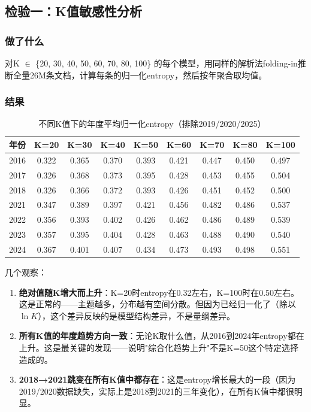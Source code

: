\documentclass[12pt,a4paper]{ctexart}
\begin{document}
\subsection{检验一：K值敏感性分析}

\subsubsection{做了什么}

对K $\in$ \{20, 30, 40, 50, 60, 70, 80, 100\} 的每个模型，用同样的解析法folding-in推断全量26M条文档，计算每条的归一化entropy，然后按年聚合取均值。

\subsubsection{结果}

\begin{table}[H]
\centering
\small
\begin{tabular}{lcccccccc}
\toprule
年份 & K=20 & K=30 & K=40 & K=50 & K=60 & K=70 & K=80 & K=100 \\
\midrule
2016 & 0.322 & 0.365 & 0.370 & 0.393 & 0.421 & 0.447 & 0.450 & 0.497 \\
2017 & 0.326 & 0.368 & 0.373 & 0.395 & 0.428 & 0.453 & 0.455 & 0.504 \\
2018 & 0.326 & 0.366 & 0.372 & 0.393 & 0.426 & 0.451 & 0.452 & 0.500 \\
2021 & 0.347 & 0.389 & 0.397 & 0.421 & 0.456 & 0.482 & 0.486 & 0.537 \\
2022 & 0.356 & 0.393 & 0.402 & 0.426 & 0.462 & 0.486 & 0.489 & 0.539 \\
2023 & 0.357 & 0.395 & 0.404 & 0.428 & 0.463 & 0.488 & 0.490 & 0.540 \\
2024 & 0.367 & 0.401 & 0.407 & 0.434 & 0.473 & 0.493 & 0.498 & 0.551 \\
\bottomrule
\end{tabular}
\caption{不同K值下的年度平均归一化entropy（排除2019/2020/2025）}
\label{tab:k-sensitivity}
\end{table}

几个观察：

\begin{enumerate}
\item \textbf{绝对值随K增大而上升}：K=20时entropy在0.32左右，K=100时在0.50左右。这是正常的——主题越多，分布越有空间分散。但因为已经归一化了（除以$\ln K$），这个差异反映的是模型结构差异，不是量纲差异。
\item \textbf{所有K值的年度趋势方向一致}：无论K取什么值，从2016到2024年entropy都在上升。这是最关键的发现——说明"综合化趋势上升"不是K=50这个特定选择造成的。
\item \textbf{2018→2021跳变在所有K值中都存在}：这是entropy增长最大的一段（因为2019/2020数据缺失，实际上是2018到2021的三年变化），在所有K值中都很明显。
\end{enumerate}
\end{document}
